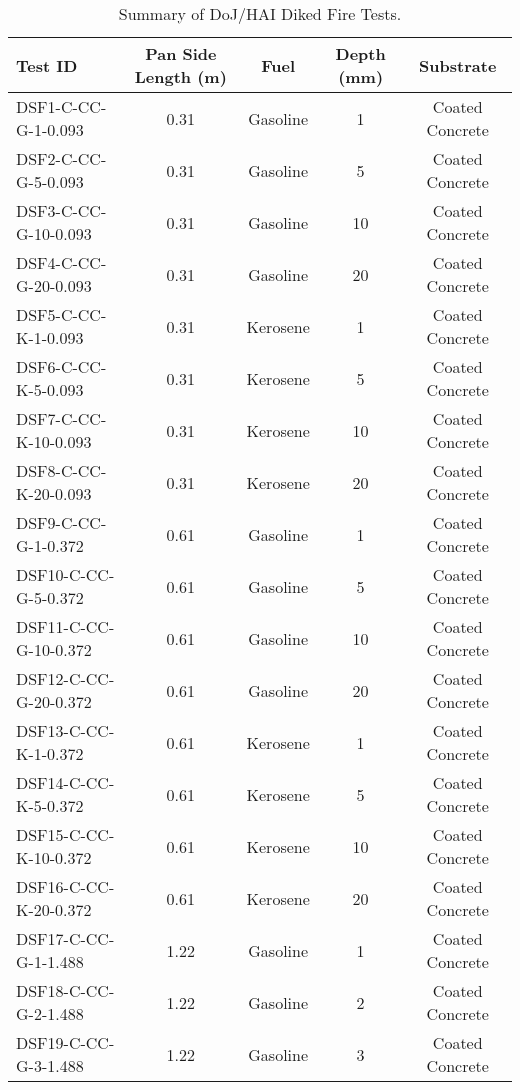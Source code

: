 \begin{table}[p]
\caption[Summary of DoJ/HAI Diked Fire Tests]{Summary of DoJ/HAI Diked Fire Tests.}
\begin{center}
\begin{tabular}{|l|c|c|c|c|}
\hline
Test ID   & Pan Side Length (m)  & Fuel &  Depth (mm)  & Substrate  \\ \hline
DSF1-C-CC-G-1-0.093    & 0.31  & Gasoline  & 1  & Coated Concrete   \\ \hline
DSF2-C-CC-G-5-0.093    & 0.31  & Gasoline  & 5  & Coated Concrete   \\ \hline
DSF3-C-CC-G-10-0.093   & 0.31  & Gasoline  & 10 & Coated Concrete   \\ \hline
DSF4-C-CC-G-20-0.093   & 0.31  & Gasoline  & 20 & Coated Concrete   \\ \hline
DSF5-C-CC-K-1-0.093    & 0.31  & Kerosene  & 1  & Coated Concrete   \\ \hline
DSF6-C-CC-K-5-0.093    & 0.31  & Kerosene  & 5  & Coated Concrete   \\ \hline
DSF7-C-CC-K-10-0.093   & 0.31  & Kerosene  & 10 & Coated Concrete   \\ \hline
DSF8-C-CC-K-20-0.093   & 0.31  & Kerosene  & 20 & Coated Concrete   \\ \hline
DSF9-C-CC-G-1-0.372    & 0.61  & Gasoline  & 1  & Coated Concrete   \\ \hline
DSF10-C-CC-G-5-0.372   & 0.61  & Gasoline  & 5  & Coated Concrete   \\ \hline
DSF11-C-CC-G-10-0.372  & 0.61  & Gasoline  & 10 & Coated Concrete   \\ \hline
DSF12-C-CC-G-20-0.372  & 0.61  & Gasoline  & 20 & Coated Concrete   \\ \hline
DSF13-C-CC-K-1-0.372   & 0.61  & Kerosene  & 1  & Coated Concrete   \\ \hline
DSF14-C-CC-K-5-0.372   & 0.61  & Kerosene  & 5  & Coated Concrete   \\ \hline
DSF15-C-CC-K-10-0.372  & 0.61  & Kerosene  & 10 & Coated Concrete   \\ \hline
DSF16-C-CC-K-20-0.372  & 0.61  & Kerosene  & 20 & Coated Concrete   \\ \hline
DSF17-C-CC-G-1-1.488   & 1.22  & Gasoline  & 1  & Coated Concrete   \\ \hline
DSF18-C-CC-G-2-1.488   & 1.22  & Gasoline  & 2  & Coated Concrete   \\ \hline
DSF19-C-CC-G-3-1.488   & 1.22  & Gasoline  & 3  & Coated Concrete   \\ \hline

\end{tabular}
\end{center}
\end{table}
